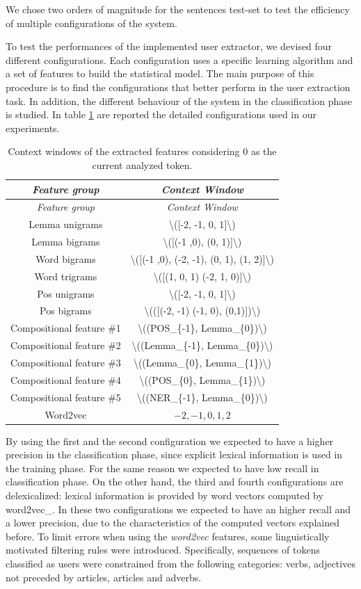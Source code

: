 \documentclass[]{book}
\begin{document}
We chose two orders of magnitude for the sentences test-set to test the
efficiency of multiple configurations of the system.

To test the performances of the implemented user extractor, we devised
four different configurations. Each configuration uses a specific
learning algorithm and a set of features to build the statistical model.
The main purpose of this procedure is to find the configurations that
better perform in the user extraction task. In addition, the different
behaviour of the system in the classification phase is studied. In table
\ref{tab:feat-confs} are reported the detailed configurations used in
our experiments.

\begin{longtable}[]{@{}cc@{}}
\caption{\label{tab:feat-confs} Context windows of the extracted features
considering 0 as the current analyzed token.}\tabularnewline
\toprule
\emph{Feature group} & \emph{Context Window}\tabularnewline
\midrule
\endfirsthead
\toprule
\emph{Feature group} & \emph{Context Window}\tabularnewline
\midrule
\endhead
Lemma unigrams & \textbackslash{}({[}-2, -1, 0,
1{]}\textbackslash{})\tabularnewline
Lemma bigrams & \textbackslash{}({[}(-1 ,0), (0,
1){]}\textbackslash{})\tabularnewline
Word bigrams & \textbackslash{}({[}(-1 ,0), (-2, -1), (0, 1), (1,
2){]}\textbackslash{})\tabularnewline
Word trigrams & \textbackslash{}({[}(1, 0, 1) (-2, 1,
0){]}\textbackslash{})\tabularnewline
Pos unigrams & \textbackslash{}({[}-2, -1, 0,
1{]}\textbackslash{})\tabularnewline
Pos bigrams & \textbackslash{}(({[}(-2, -1) (-1, 0),
(0,1){]})\textbackslash{})\tabularnewline
Compositional feature \#1 & \textbackslash{}((POS\_\{-1\},
Lemma\_\{0\})\textbackslash{})\tabularnewline
Compositional feature \#2 & \textbackslash{}((Lemma\_\{-1\},
Lemma\_\{0\})\textbackslash{})\tabularnewline
Compositional feature \#3 & \textbackslash{}((Lemma\_\{0\},
Lemma\_\{1\})\textbackslash{})\tabularnewline
Compositional feature \#4 & \textbackslash{}((POS\_\{0\},
Lemma\_\{1\})\textbackslash{})\tabularnewline
Compositional feature \#5 & \textbackslash{}((NER\_\{-1\},
Lemma\_\{0\})\textbackslash{})\tabularnewline
Word2vec & \(-2, -1, 0, 1, 2\)\tabularnewline
\bottomrule
\end{longtable}

By using the first and the second configuration we expected to have a
higher precision in the classification phase, since explicit lexical
information is used in the training phase. For the same reason we
expected to have low recall in classification phase. On the other hand,
the third and fourth configurations are delexicalized: lexical
information is provided by word vectors computed by word2vec\_. In these
two configurations we expected to have an higher recall and a lower
precision, due to the characteristics of the computed vectors explained
before. To limit errors when using the \emph{word2vec} features, some
linguistically motivated filtering rules were introduced. Specifically,
sequences of tokens classified as users were constrained from the
following categories: verbs, adjectives not preceded by articles,
articles and adverbs.
\end{document}
